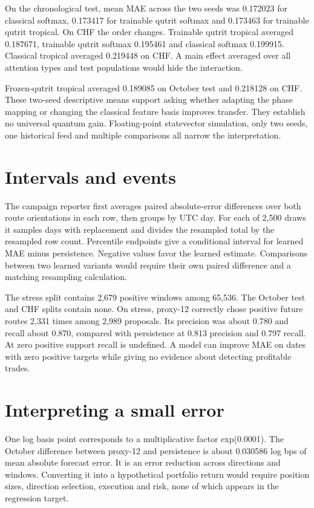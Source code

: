 \documentclass[11pt,oneside,openany]{book}
\begin{document}
On the chronological test, mean MAE across the two seeds was 0.172023 for classical softmax, 0.173417 for trainable qutrit softmax and 0.173463 for trainable qutrit tropical. On CHF the order changes. Trainable qutrit tropical averaged 0.187671, trainable qutrit softmax 0.195461 and classical softmax 0.199915. Classical tropical averaged 0.219448 on CHF. A main effect averaged over all attention types and test populations would hide the interaction.

Frozen-qutrit tropical averaged 0.189085 on October test and 0.218128 on CHF. These two-seed descriptive means support asking whether adapting the phase mapping or changing the classical feature basis improves transfer. They establish no universal quantum gain. Floating-point statevector simulation, only two seeds, one historical feed and multiple comparisons all narrow the interpretation.

\section*{Intervals and events}
The campaign reporter first averages paired absolute-error differences over both route orientations in each row, then groups by UTC day. For each of 2,500 draws it samples days with replacement and divides the resampled total by the resampled row count. Percentile endpoints give a conditional interval for learned MAE minus persistence. Negative values favor the learned estimate. Comparisons between two learned variants would require their own paired difference and a matching resampling calculation.

The stress split contains 2,679 positive windows among 65,536. The October test and CHF splits contain none. On stress, proxy-12 correctly chose positive future routes 2,331 times among 2,989 proposals. Its precision was about 0.780 and recall about 0.870, compared with persistence at 0.813 precision and 0.797 recall. At zero positive support recall is undefined. A model can improve MAE on dates with zero positive targets while giving no evidence about detecting profitable trades.

\section*{Interpreting a small error}
One log basis point corresponds to a multiplicative factor exp(0.0001). The October difference between proxy-12 and persistence is about 0.030586 log bps of mean absolute forecast error. It is an error reduction across directions and windows. Converting it into a hypothetical portfolio return would require position sizes, direction selection, execution and risk, none of which appears in the regression target.
\end{document}
